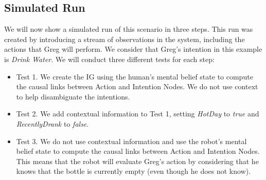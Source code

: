 \subsection{Simulated Run}
We will now show a simulated run of this scenario in three steps. This run was created by introducing a stream of observations in the system, including the actions that Greg will perform. We consider that Greg's intention in this example is \textit{Drink Water}. We will conduct three different tests for each step:
\begin{itemize}
	\item Test 1. We create the IG using the human's mental belief state to compute the causal links between Action and Intention Nodes. We do not use context to help disambiguate the intentions.
	\item Test 2. We add contextual information to Test 1, setting \textit{HotDay} to \textit{true} and \textit{RecentlyDrank} to \textit{false}.
	\item Test 3. We do not use contextual information and use the robot's mental belief state to compute the causal links between Action and Intention Nodes. This means that the robot will evaluate Greg's action by considering that he knows that the bottle is currently empty (even though he does not know).
\end{itemize}

